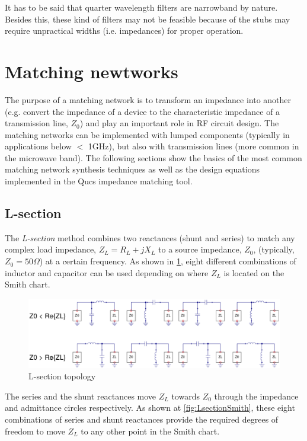 \noindent It has to be said that quarter wavelength filters are narrowband by nature. Besides this, these kind of filters may not be feasible because of the stubs may require unpractical widths (i.e. impedances) for proper operation.


\section{Matching newtworks}
The purpose of a matching network is to transform an impedance into another (e.g. convert the impedance of a device to the characteristic impedance of a transmission line, $Z_0$) and play an important role in RF circuit design. The matching networks can be implemented with lumped components (typically in applications below $<$ 1GHz), but also with transmission lines (more common in the microwave band). The following sections show the basics of the most common matching network synthesis techniques as well as the design equations implemented in the Qucs impedance matching tool.

\subsection{L-section}
The \textit{L-section} method combines two reactances (shunt and series) to match any complex load impedance, $Z_L = R_L + jX_L$ to a source impedance, $Z_0$, (typically, $Z_0 = 50\Omega$) at a certain frequency. As shown in \ref{fig:Lsection}, eight different combinations of inductor and capacitor can be used depending on where $Z_L$ is located on the Smith chart.

\begin{figure}[H]
\centering
\includegraphics[width=120mm]{./images/Synthesis/Impedance_Matching/Lsection}
\caption{L-section topology}
\label{fig:Lsection}
\end{figure}

The series and the shunt reactances move $Z_L$ towards $Z_0$ through the impedance and admittance circles respectively. As shown at \ref{fig:LsectionSmith}, these eight combinations of series and shunt reactances provide the required degrees of freedom to move $Z_L$ to any other point in the Smith chart.


